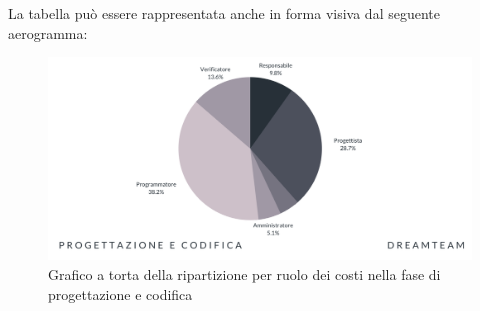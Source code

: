 La tabella può essere rappresentata anche in forma visiva dal seguente aerogramma:
\begin{figure}[H]
\centering
\includegraphics[scale=0.65]{Sezioni/SezioniPreventivo/grafici/Progettazione_costi.png}
\caption{Grafico a torta della ripartizione per ruolo dei costi nella fase di progettazione e codifica}
\end{figure}



